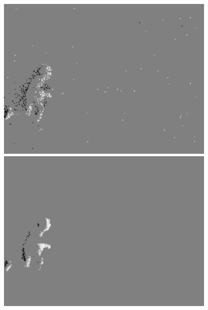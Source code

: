 \begin{figure}
    \centering
    \begin{minipage}{0.33\textwidth}
        \centering
        \includegraphics[width = 0.95\textwidth]{images/unfiltered_run1.png}
    \end{minipage}\hfill
    \begin{minipage}{0.33\textwidth}
        \centering
        \includegraphics[width = 0.95\textwidth]{images/filtered_run1.png}
    \end{minipage}\hfill
    \begin{minipage}{0.33\textwidth}
        \centering

\end{minipage}
\end{figure}
